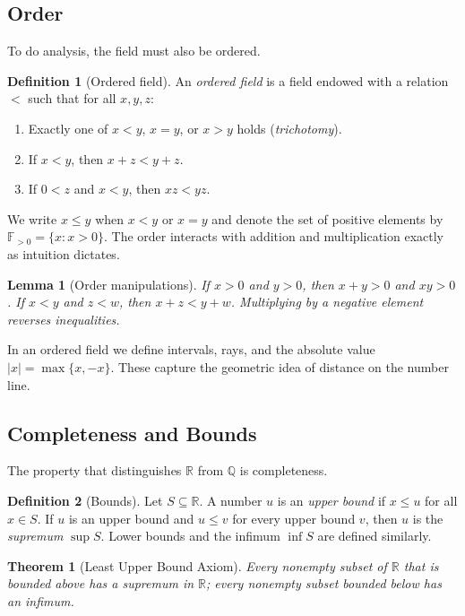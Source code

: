 \documentclass{article}
\theoremstyle{definition}
\newtheorem{definition}{Definition}[section]
\theoremstyle{plain}
\newtheorem{theorem}{Theorem}[section]
\newtheorem{lemma}{Lemma}[section]
\begin{document}
	\subsection{Order}\label{subsec:order}
	To do analysis, the field must also be ordered.

	\begin{definition}[Ordered field]
		An \emph{ordered field} is a field endowed with a relation $<$ such that for all $x,y,z$:
		\begin{enumerate}
			\item Exactly one of $x<y$, $x=y$, or $x>y$ holds (\emph{trichotomy}).
			\item If $x<y$, then $x+z<y+z$.
			\item If $0<z$ and $x<y$, then $xz<yz$.
		\end{enumerate}
	\end{definition}

	We write $x\le y$ when $x<y$ or $x=y$ and denote the set of positive elements by $\mathbb{F}_{>0} = \{x : x>0\}$. The order interacts with addition and multiplication exactly as intuition dictates.

	\begin{lemma}[Order manipulations]\label{lem:order}
		If $x>0$ and $y>0$, then $x+y>0$ and $xy>0$. If $x<y$ and $z<w$, then $x+z<y+w$. Multiplying by a negative element reverses inequalities.
	\end{lemma}

	In an ordered field we define intervals, rays, and the absolute value $|x| = \max\{x,-x\}$. These capture the geometric idea of distance on the number line.

	\subsection{Completeness and Bounds}\label{subsec:completeness}
	The property that distinguishes $\mathbb{R}$ from $\mathbb{Q}$ is completeness.

	\begin{definition}[Bounds]\label{def:bounds}
		Let $S\subseteq \mathbb{R}$. A number $u$ is an \emph{upper bound} if $x\le u$ for all $x\in S$. If $u$ is an upper bound and $u\le v$ for every upper bound $v$, then $u$ is the \emph{supremum} $\sup S$. Lower bounds and the infimum $\inf S$ are defined similarly.
	\end{definition}

	\begin{theorem}[Least Upper Bound Axiom]\label{thm:lub}
		Every nonempty subset of $\mathbb{R}$ that is bounded above has a supremum in $\mathbb{R}$; every nonempty subset bounded below has an infimum.
	\end{theorem}
\end{document}
